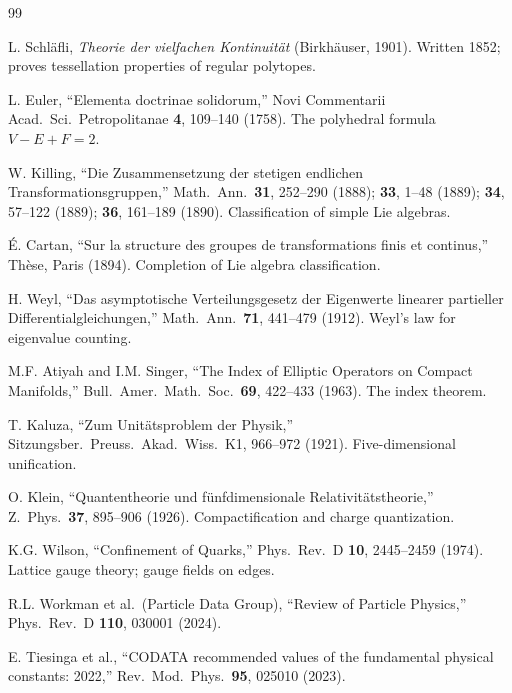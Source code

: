 \documentclass[11pt,a4paper]{article}
\theoremstyle{plain}
\theoremstyle{definition}
\theoremstyle{remark}
\begin{document}
\begin{thebibliography}{99}

 L. Schl\"afli, \emph{Theorie der vielfachen Kontinuit\"at} (Birkh\"auser, 1901). Written 1852; proves tessellation properties of regular polytopes.

 L. Euler, ``Elementa doctrinae solidorum,'' Novi Commentarii Acad.\ Sci.\ Petropolitanae \textbf{4}, 109--140 (1758). The polyhedral formula $V - E + F = 2$.

 W. Killing, ``Die Zusammensetzung der stetigen endlichen Transformationsgruppen,'' Math.\ Ann.\ \textbf{31}, 252--290 (1888); \textbf{33}, 1--48 (1889); \textbf{34}, 57--122 (1889); \textbf{36}, 161--189 (1890). Classification of simple Lie algebras.

 \'E. Cartan, ``Sur la structure des groupes de transformations finis et continus,'' Th\`ese, Paris (1894). Completion of Lie algebra classification.

 H. Weyl, ``Das asymptotische Verteilungsgesetz der Eigenwerte linearer partieller Differentialgleichungen,'' Math.\ Ann.\ \textbf{71}, 441--479 (1912). Weyl's law for eigenvalue counting.

 M.F. Atiyah and I.M. Singer, ``The Index of Elliptic Operators on Compact Manifolds,'' Bull.\ Amer.\ Math.\ Soc.\ \textbf{69}, 422--433 (1963). The index theorem.

 T. Kaluza, ``Zum Unit\"atsproblem der Physik,'' Sitzungsber.\ Preuss.\ Akad.\ Wiss.\ K1, 966--972 (1921). Five-dimensional unification.

 O. Klein, ``Quantentheorie und f\"unfdimensionale Relativit\"atstheorie,'' Z.\ Phys.\ \textbf{37}, 895--906 (1926). Compactification and charge quantization.

 K.G. Wilson, ``Confinement of Quarks,'' Phys.\ Rev.\ D \textbf{10}, 2445--2459 (1974). Lattice gauge theory; gauge fields on edges.

 R.L. Workman et al.\ (Particle Data Group), ``Review of Particle Physics,'' Phys.\ Rev.\ D \textbf{110}, 030001 (2024).

 E. Tiesinga et al., ``CODATA recommended values of the fundamental physical constants: 2022,'' Rev.\ Mod.\ Phys.\ \textbf{95}, 025010 (2023).


\end{thebibliography}
\end{document}
